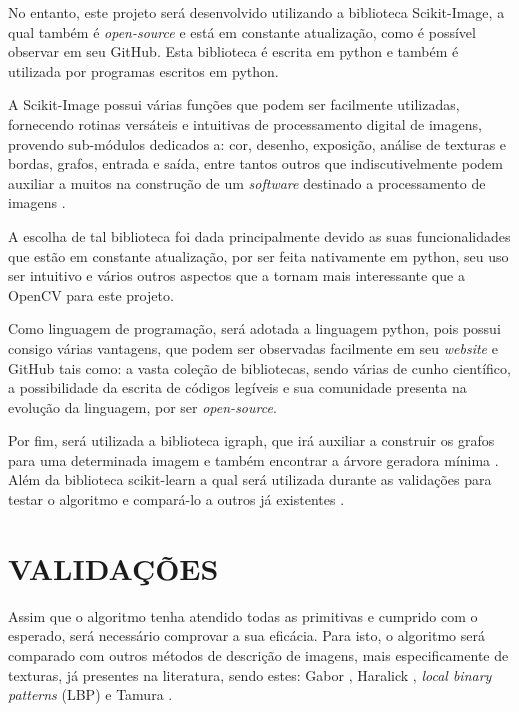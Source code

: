 \par No entanto, este projeto será desenvolvido utilizando a biblioteca Scikit-Image, a qual também é \textit{open-source} e está em constante atualização, como é possível observar em seu GitHub. Esta biblioteca é escrita em python e também é utilizada por programas escritos em python.

\par A Scikit-Image possui várias funções que podem ser facilmente utilizadas, fornecendo rotinas versáteis e intuitivas de processamento digital de imagens, provendo sub-módulos dedicados a: cor, desenho, exposição, análise de texturas e bordas, grafos, entrada e saída, entre tantos outros que indiscutivelmente podem auxiliar a muitos na construção de um \textit{software} destinado a processamento de imagens  \cite{ScikitImage}.

\par A escolha de tal biblioteca foi dada principalmente devido as suas funcionalidades que estão em constante atualização, por ser feita nativamente em python, seu uso ser intuitivo e vários outros aspectos que a tornam mais interessante que a OpenCV para este projeto.

\par Como linguagem de programação, será adotada a linguagem python, pois possui consigo várias vantagens, que podem ser observadas facilmente em seu \textit{website} e GitHub tais como: a vasta coleção de bibliotecas, sendo várias de cunho científico, a possibilidade da escrita de códigos legíveis e sua comunidade presenta na evolução da linguagem, por ser \textit{open-source}.


\par Por fim, será utilizada a biblioteca igraph, que irá auxiliar a construir os grafos para uma determinada imagem e também encontrar a árvore geradora mínima \cite{igraph}. Além da biblioteca scikit-learn a qual será utilizada durante as validações para testar o algoritmo e compará-lo a outros já existentes \cite{scikit-learn}.

\section{VALIDAÇÕES}
\label{sec:validacoes}

\par Assim que o algoritmo tenha atendido todas as primitivas e cumprido com o esperado, será necessário comprovar a sua eficácia. Para isto, o algoritmo será comparado com outros métodos de descrição de imagens, mais especificamente de texturas, já presentes na literatura, sendo estes: Gabor \cite{gaborZhang2000content}, Haralick \cite{haralick1973textural}, \textit{local binary patterns} (LBP) \cite{lbp-guo2010rotation} e Tamura \cite{tamura1978textural}.

